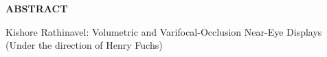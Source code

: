 
\begin{center}
\vspace*{52pt}
{\Large \textbf{ABSTRACT}}
\vspace{11pt}

\begin{singlespace}
Kishore Rathinavel: Volumetric and Varifocal-Occlusion Near-Eye Displays\\
(Under the direction of Henry Fuchs)
\end{singlespace}
\end{center}

